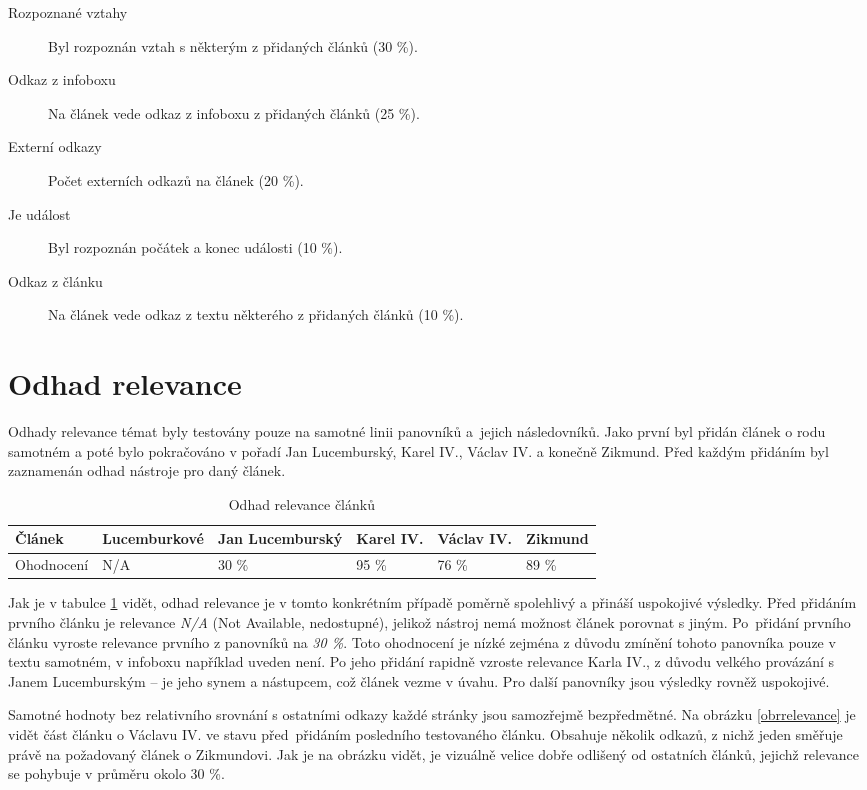 \begin{description}
	\item[Rozpoznané vztahy] Byl rozpoznán vztah s některým z přidaných článků (30 \%).
	\item[Odkaz z infoboxu] Na článek vede odkaz z infoboxu z přidaných článků (25 \%).
	\item[Externí odkazy] Počet externích odkazů na článek (20 \%).
	\item[Je událost] Byl rozpoznán počátek a konec události (10 \%).
	\item[Odkaz z článku] Na článek vede odkaz z textu některého z přidaných článků (10 \%).
\end{description}

\section{Odhad relevance}
Odhady relevance témat byly testovány pouze na samotné linii panovníků a~jejich následovníků. Jako první byl přidán článek o rodu samotném a poté bylo pokračováno v pořadí Jan Lucemburský, Karel IV., Václav IV. a konečně Zikmund. Před každým přidáním byl zaznamenán odhad nástroje pro daný článek.

\begin{table}[h]
\centering
\begin{tabular}{|l||l|l|l|l|l|}
\hline
Článek 		& Lucemburkové  & Jan Lucemburský	& Karel IV.	& Václav IV.& Zikmund  \\ \hline
Ohodnocení 	& N/A 			& 30 \% 			& 95 \%		& 76 \%		& 89 \%\\ \hline
\end{tabular}
\caption{Odhad relevance článků}
\label{tabRelevance}
\end{table}

Jak je v tabulce \ref{tabRelevance} vidět, odhad relevance je v tomto konkrétním případě poměrně spolehlivý a přináší uspokojivé výsledky. Před přidáním prvního článku je relevance \textit{N/A} (Not Available, nedostupné), jelikož nástroj nemá možnost článek porovnat s jiným. Po~přidání prvního článku vyroste relevance prvního z panovníků na \textit{30 \%}. Toto ohodnocení je nízké zejména z důvodu zmínění tohoto panovníka pouze v textu samotném, v infoboxu například uveden není. Po jeho přidání rapidně vzroste relevance Karla IV., z důvodu velkého provázání s Janem Lucemburským -- je jeho synem a nástupcem, což článek vezme v úvahu. Pro další panovníky jsou výsledky rovněž uspokojivé.

Samotné hodnoty bez relativního srovnání s ostatními odkazy každé stránky jsou samozřejmě bezpředmětné. Na obrázku \ref{obrrelevance} je vidět část článku o Václavu IV. ve stavu před~přidáním posledního testovaného článku. Obsahuje několik odkazů, z nichž jeden směřuje právě na požadovaný článek o Zikmundovi. Jak je na obrázku vidět, je vizuálně velice dobře odlišený od ostatních článků, jejichž relevance se pohybuje v průměru okolo 30 \%.

